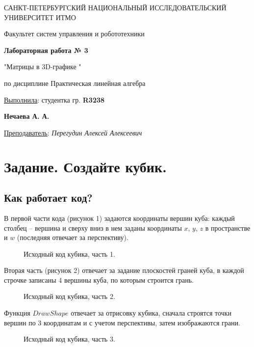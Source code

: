 \documentclass[a5paper, 10pt]{article}
\theoremstyle{definition}
\theoremstyle{plain}
\theoremstyle{remark}
\newcommand*{\titlePage}{
	\thispagestyle{title}
	\begingroup
	\begin{center}
		\vspace*{6ex}
		
		{\small
			САНКТ-ПЕТЕРБУРГСКИЙ НАЦИОНАЛЬНЫЙ ИССЛЕДОВАТЕЛЬСКИЙ УНИВЕРСИТЕТ ИТМО	
		}
		
		\vspace*{2ex}
		
		{\normalsize
			Факультет систем управления и робототехники
		}
		
		\vspace*{15ex}
		
		{\Large \bfseries 
			Лабораторная работа № 3
		}
\vspace*{2ex}
	{\Large \bfseries 
			
"Матрицы в 3D-графике "
		}
\vspace*{2ex}
		
		{\normalsize
			по дисциплине Практическая линейная алгебра
		}

	\end{center}
	\vspace*{20ex}
	\begin{flushright}
		{\large 
			\underline{Выполнила}: студентка гр. \textbf{R3238}\\
			\begin{flushright}
				\textbf{Нечаева А. А.}\\
			\end{flushright}
		}
		
		\vspace*{5ex}
		
		{\large 
			\underline{Преподаватель}: \textit{Перегудин Алексей Алексеевич}
		}
	\end{flushright}	
	\newpage
	\setcounter{page}{1}
	\endgroup}
\begin{document}
	\titlePage
	\pagestyle{style}
\newpage




\section{Задание. Создайте кубик.}

\subsection{Как работает код?}
В первой части кода (рисунок 1) задаются координаты вершин куба: каждый столбец -- вершина и сверху вниз в нем заданы координаты $x$, $y$, $z$ в пространстве и $w$ (последняя отвечает за перспективу).
\begin{figure}[h!]
\caption{Исходный код кубика, часть 1.}
\end{figure}

Вторая часть (рисунок 2) отвечает за задание плоскостей граней куба, в каждой строчке записаны 4 вершины куба, по которым строится грань.
\begin{figure}[h!]
\caption{Исходный код кубика, часть 2.}
\end{figure}

Функция $DrawShape$ отвечает за отрисовку кубика, сначала строятся точки вершин по 3 координатам и с учетом перспективы, затем изображаются грани.
\begin{figure}[h!]
\caption{Исходный код кубика, часть 3.}
\end{figure}
\end{document}
